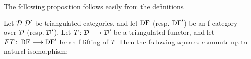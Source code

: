The following proposition follows easily from the definitions.

\begin{proposition}
Let $\mathcal{D},\mathcal{D}'$ be triangulated categories, and let $\operatorname{DF}$ (resp. $\operatorname{DF}'$) be an f-category over $\mathcal{D}$ (resp. $\mathcal{D}'$).
Let $T\colon \mathcal{D}\longrightarrow\mathcal{D}'$ be a triangulated functor, and let $FT\colon \operatorname{DF}\longrightarrow\operatorname{DF}'$ be an f-lifting of $T$.
Then the following squares commute up to natural isomorphism:

\label{prop_f_lifting}
\end{proposition}





